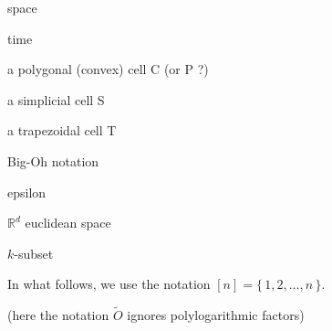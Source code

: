 
space

time

a polygonal (convex) cell C (or P ?)

a simplicial cell S

a trapezoidal cell T

Big-Oh notation

epsilon

\(\mathbb{R}^d\) euclidean space

\(k\)-subset

In what follows, we use the notation \([n] = \{\,1,2,\ldots ,n\,\}\).

(here the notation $\tilde{O}$ ignores polylogarithmic
factors)
